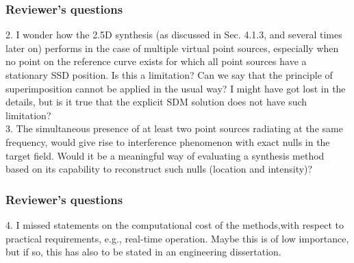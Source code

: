 \documentclass{beamer}
\begin{document}
\begin{frame}
\frametitle{Reviewer's questions}
2. I wonder how the 2.5D synthesis (as discussed in Sec. 4.1.3, and several times later on) performs in the case of multiple virtual point sources, especially when no point on the reference curve exists for which all point sources have a stationary SSD position. Is this a limitation? Can we say that the principle of superimposition cannot be applied in the usual way? I might have got lost in the details, but is it true that the explicit SDM solution does not have such limitation?
\\ \vspace{2mm}
3. The simultaneous presence of at least two point sources radiating at the same frequency, would give rise to interference phenomenon with exact nulls in the target field. Would it be a meaningful way of evaluating a synthesis method based on its capability to reconstruct such nulls (location and intensity)?
\end{frame}

\begin{frame}
\frametitle{Reviewer's questions}
4. I missed statements on the computational cost of the methods,with respect to practical requirements, e.g., real-time operation. Maybe this is of low importance, but if so, this has also to be stated in an engineering dissertation.
\end{frame}
\end{document}
